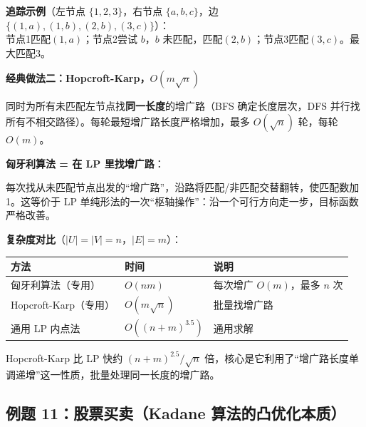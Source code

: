 \documentclass[12pt, a4paper]{ctexart}
\begin{document}
\begin{blackboard}
\textbf{追踪示例}（左节点 $\{1,2,3\}$，右节点 $\{a,b,c\}$，边 $\{(1,a),(1,b),(2,b),(3,c)\}$）：\\
节点1匹配$(1,a)$；节点2尝试 $b$，$b$ 未匹配，匹配$(2,b)$；节点3匹配$(3,c)$。最大匹配3。

\textbf{经典做法二：Hopcroft-Karp，$O(m\sqrt{n})$}

同时为所有未匹配左节点找\textbf{同一长度}的增广路（BFS 确定长度层次，DFS 并行找所有不相交路径）。每轮最短增广路长度严格增加，最多 $O(\sqrt{n})$ 轮，每轮 $O(m)$。

\textbf{匈牙利算法 = 在 LP 里找增广路}：

每次找从未匹配节点出发的``增广路''，沿路将匹配/非匹配交替翻转，使匹配数加 1。这等价于 LP 单纯形法的一次``枢轴操作''：沿一个可行方向走一步，目标函数严格改善。

\textbf{复杂度对比}（$|U|=|V|=n$，$|E|=m$）：

\begin{center}
\begin{tabular}{lll}
\toprule
方法 & 时间 & 说明 \\
\midrule
匈牙利算法（专用） & $O(nm)$ & 每次增广 $O(m)$，最多 $n$ 次 \\
Hopcroft-Karp（专用） & $O(m\sqrt{n})$ & 批量找增广路 \\
通用 LP 内点法 & $O((n+m)^{3.5})$ & 通用求解 \\
\bottomrule
\end{tabular}
\end{center}

Hopcroft-Karp 比 LP 快约 $(n+m)^{2.5}/\sqrt{n}$ 倍，核心是它利用了``增广路长度单调递增''这一性质，批量处理同一长度的增广路。

\end{blackboard}

\subsection{例题 11：股票买卖（Kadane 算法的凸优化本质）}
\end{document}
